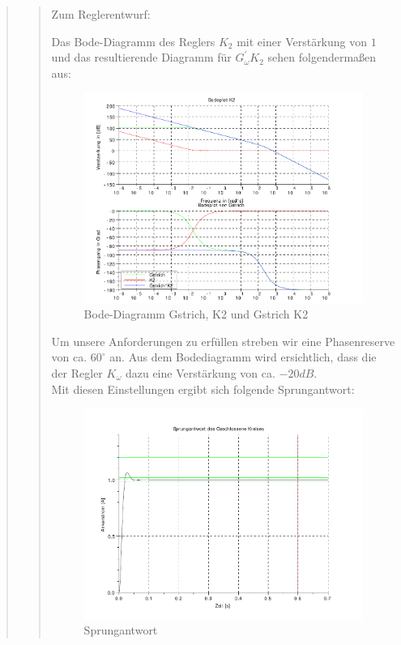 \begin{quote}
\begin{quote}
		
		Zum Reglerentwurf:\vspace{1em}
		
		Das Bode-Diagramm des Reglers $K_2$ mit einer Verstärkung von $1$ und das resultierende Diagramm für $G_\omega^{'}
		K_2$ sehen folgendermaßen aus:
		\begin{figure}[H]
        \centering
            \includegraphics[scale=0.7, trim = 0cm 0cm 0cm 0cm, clip]{./Bilder/K2GstrichVersion1verstaerkung1}
                \caption{Bode-Diagramm Gstrich, K2 und Gstrich K2}
        \end{figure}
    
        Um unsere Anforderungen zu erfüllen streben wir eine Phasenreserve von ca. $60^{\circ}$ an. Aus dem Bodediagramm
        wird ersichtlich, dass die der Regler $K_\omega$ dazu eine Verstärkung von ca. $-20dB$.\\
        Mit diesen Einstellungen ergibt sich folgende Sprungantwort:
        \begin{figure}[H]
        \centering
            \includegraphics[scale=0.7, trim = 0cm 0cm 0cm 0cm, clip]{./Bilder/Sprungantwortlangsam}
                \caption{Sprungantwort}
        \end{figure}
    

\end{quote}
\end{quote}
